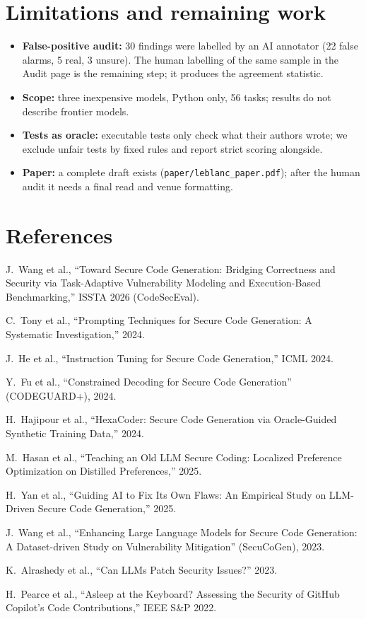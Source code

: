 \documentclass[11pt]{article}
\begin{document}
\section{Limitations and remaining work}
\begin{itemize}
\item \textbf{False-positive audit:} 30 findings were labelled by an AI annotator (22 false alarms, 5 real, 3
      unsure). The human labelling of the same sample in the Audit page is the remaining step; it produces the
      agreement statistic.
\item \textbf{Scope:} three inexpensive models, Python only, 56 tasks; results do not describe frontier models.
\item \textbf{Tests as oracle:} executable tests only check what their authors wrote; we exclude unfair tests by
      fixed rules and report strict scoring alongside.
\item \textbf{Paper:} a complete draft exists (\texttt{paper/leblanc\_paper.pdf}); after the human audit it needs a
      final read and venue formatting.
\end{itemize}

\section*{References}
\small
\begin{enumerate}[label={[\arabic*]}]
\item J.~Wang et al., ``Toward Secure Code Generation: Bridging Correctness and Security via Task-Adaptive
      Vulnerability Modeling and Execution-Based Benchmarking,'' ISSTA 2026 (CodeSecEval).
\item C.~Tony et al., ``Prompting Techniques for Secure Code Generation: A Systematic Investigation,'' 2024.
\item J.~He et al., ``Instruction Tuning for Secure Code Generation,'' ICML 2024.
\item Y.~Fu et al., ``Constrained Decoding for Secure Code Generation'' (CODEGUARD+), 2024.
\item H.~Hajipour et al., ``HexaCoder: Secure Code Generation via Oracle-Guided Synthetic Training Data,'' 2024.
\item M.~Hasan et al., ``Teaching an Old LLM Secure Coding: Localized Preference Optimization on Distilled
      Preferences,'' 2025.
\item H.~Yan et al., ``Guiding AI to Fix Its Own Flaws: An Empirical Study on LLM-Driven Secure Code Generation,'' 2025.
\item J.~Wang et al., ``Enhancing Large Language Models for Secure Code Generation: A Dataset-driven Study on
      Vulnerability Mitigation'' (SecuCoGen), 2023.
\item K.~Alrashedy et al., ``Can LLMs Patch Security Issues?'' 2023.
\item H.~Pearce et al., ``Asleep at the Keyboard? Assessing the Security of GitHub Copilot's Code Contributions,''
      IEEE S\&P 2022.
\end{enumerate}
\end{document}
